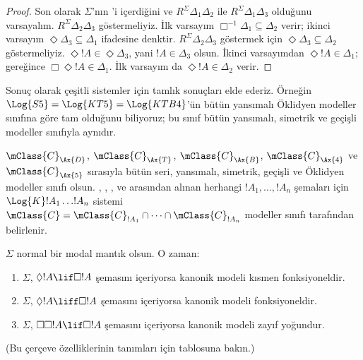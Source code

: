 \begin{proof}
  Son olarak $\Sigma$'nın 'i içerdiğini ve
  $R^\Sigma\Delta_1\Delta_2$ ile $R^\Sigma\Delta_1\Delta_3$ olduğunu
  varsayalım. $R^\Sigma\Delta_2\Delta_3$ göstermeliyiz. İlk varsayım
  $\Box^{-1}\Delta_1\subseteq\Delta_2$ verir; ikinci varsayım
  $\Diamond\Delta_3\subseteq\Delta_1$ ifadesine denktir.
  $R^\Sigma\Delta_2\Delta_3$ göstermek için
  $\Diamond\Delta_3\subseteq\Delta_2$ göstermeliyiz.
  $\Diamond!A\in\Diamond\Delta_3$, yani $!A\in\Delta_3$ olsun. İkinci
  varsayımdan $\Diamond!A\in\Delta_1$;  gereğince
  $\Box\Diamond!A\in\Delta_1$. İlk varsayım da
  $\Diamond!A\in\Delta_2$ verir.
\end{proof}

Sonuç olarak çeşitli sistemler için tamlık sonuçları elde ederiz. Örneğin
$\Log{S5}=\Log{KT5}=\Log{KTB4}$'ün bütün yansımalı Öklidyen modeller
sınıfına göre tam olduğunu biliyoruz; bu sınıf bütün yansımalı, simetrik ve
geçişli modeller sınıfıyla aynıdır.

\begin{thm}
  $\mClass{C}_\Ax{D}$, $\mClass{C}_\Ax{T}$,
  $\mClass{C}_\Ax{B}$, $\mClass{C}_\Ax{4}$ ve
  $\mClass{C}_\Ax{5}$ sırasıyla bütün seri, yansımalı, simetrik, geçişli ve
  Öklidyen modeller sınıfı olsun. , , ,  ve
   arasından alınan herhangi $!A_1,\dots,!A_n$ şemaları için
  $\Log{K}!A_1\dots !A_n$ sistemi
  $\mClass{C}=\mClass{C}_{!A_1}\cap\dots\cap\mClass{C}_{!A_n}$ modeller
  sınıfı tarafından belirlenir.
\end{thm}

\begin{prop}
  $\Sigma$ normal bir modal mantık olsun. O zaman:
  \begin{enumerate}
  \item{}%
    $\Sigma$, $\Diamond!A\lif\Box!A$ şemasını içeriyorsa kanonik modeli
    kısmen fonksiyoneldir.
  \item $\Sigma$, $\Diamond!A\liff\Box!A$ şemasını içeriyorsa kanonik
    modeli fonksiyoneldir.
  \item $\Sigma$, $\Box\Box!A\lif\Box!A$ şemasını içeriyorsa kanonik
    modeli zayıf yoğundur.
  \end{enumerate}
  (Bu çerçeve özelliklerinin tanımları için
   tablosuna bakın.)
\end{prop}

